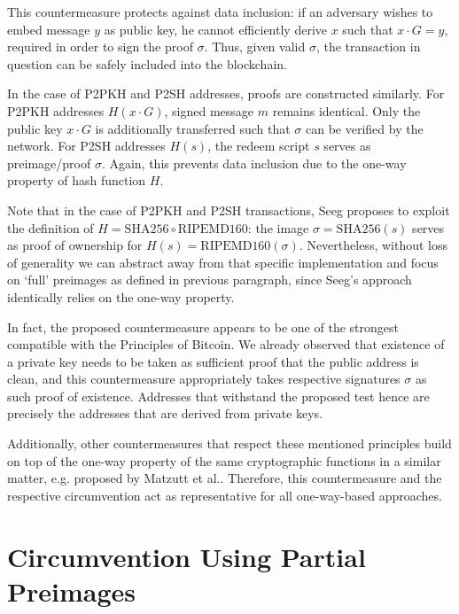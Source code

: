 \documentclass[a4paper,11pt,titlepage]{scrbook}
\begin{document}
This countermeasure protects against data inclusion: if an adversary wishes to embed message $y$ as public key, he cannot efficiently derive $x$ such that $x\cdot G = y$, required in order to sign the proof $\sigma$.
Thus, given valid $\sigma$, the transaction in question can be safely included into the blockchain.

In the case of P2PKH and P2SH addresses, proofs are constructed similarly.
For P2PKH addresses $H(x\cdot G)$, signed message $m$ remains identical.
Only the public key $x\cdot G$ is additionally transferred such that $\sigma$ can be verified by the network.
For P2SH addresses $H(s)$, the redeem script $s$ serves as preimage/proof $\sigma$.
Again, this prevents data inclusion due to the one-way property of hash function $H$.

Note that in the case of P2PKH and P2SH transactions, Seeg proposes to exploit the definition of $H=\mathrm{SHA256}\circ\mathrm{RIPEMD160}$: the image $\sigma = \mathrm{SHA256}(s)$ serves as proof of ownership for $H(s)=\mathrm{RIPEMD160}(\sigma)$.
Nevertheless, without loss of generality we can abstract away from that specific implementation and focus on \enquote*{full} preimages as defined in previous paragraph, since Seeg's approach identically relies on the one-way property.

In fact, the proposed countermeasure appears to be one of the strongest compatible with the Principles of Bitcoin.
We already observed that existence of a private key needs to be taken as sufficient proof that the public address is clean, and this countermeasure appropriately takes respective signatures $\sigma$ as such proof of existence.
Addresses that withstand the proposed test hence are precisely the addresses that are derived from private keys.

Additionally, other countermeasures that respect these mentioned principles build on top of the one-way property of the same cryptographic functions in a similar matter, e.g.\@ {} proposed by Matzutt et al.\@ \cite[Sec.~IV.D]{matzutt_thwarting_2018}.
Therefore, this countermeasure and the respective circumvention act as representative for all one-way-based approaches.

\section{Circumvention Using Partial Preimages}\label{sec:circumvention}
\end{document}
